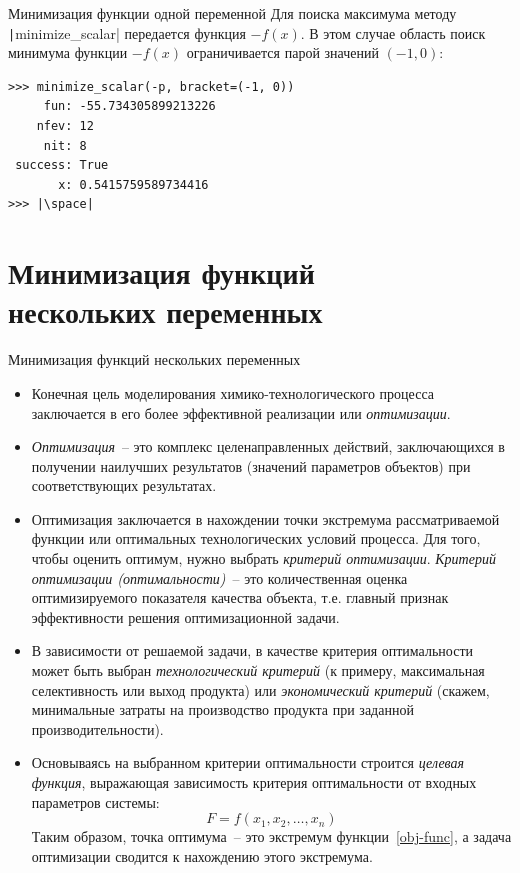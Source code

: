 \documentclass[aspectratio=169, mathserif]{beamer}	%
\begin{document}
\begin{frame}[fragile]{Минимизация функции одной переменной}
\scriptsize
Для поиска максимума методу \texttt|minimize_scalar| передается функция $-f(x)$. В этом случае область поиск минимума функции $-f(x)$ ограничивается парой значений $(-1, 0)$:
\vfill
\begin{verbatim}
>>> minimize_scalar(-p, bracket=(-1, 0))
     fun: -55.734305899213226
    nfev: 12
     nit: 8
 success: True
       x: 0.5415759589734416
>>> |\space|
\end{verbatim}
\vfill
\end{frame}

\section{Минимизация функций \\ нескольких переменных}
\sectionframe

\begin{frame}[fragile]{Минимизация функций нескольких переменных}
\scriptsize
\begin{itemize}
	\item Конечная цель моделирования химико-технологического процесса заключается в его более эффективной реализации или \textit{оптимизации}.

	\item \textit{Оптимизация}~-- это комплекс целенаправленных действий, заключающихся в получении наилучших результатов (значений параметров объектов) при соответствующих результатах.

	\item Оптимизация заключается в нахождении точки экстремума рассматриваемой функции или оптимальных технологических условий процесса. Для того, чтобы оценить оптимум, нужно выбрать \textit{критерий оптимизации}. \textit{Критерий оптимизации (оптимальности)}~-- это количественная оценка оптимизируемого показателя качества объекта, т.е. главный признак эффективности решения оптимизационной задачи.

	\item В зависимости от решаемой задачи, в качестве критерия оптимальности может быть выбран \textit{технологический критерий} (к примеру, максимальная селективность или выход продукта) или \textit{экономический критерий} (скажем, минимальные затраты на производство продукта при заданной производительности).

	\item Основываясь на выбранном критерии оптимальности строится \textit{целевая функция}, выражающая зависимость критерия оптимальности от входных параметров системы:
	\begin{equation}\label{obj-func}
		F = f(x_1, x_2, \ldots, x_n)
	\end{equation}
	Таким образом, точка оптимума~-- это экстремум функции~\eqref{obj-func}, а задача оптимизации сводится к нахождению этого экстремума.
\end{itemize}
\vfill
\end{frame}
\end{document}
